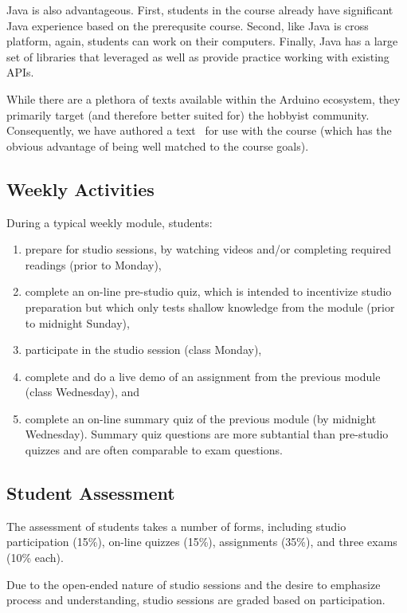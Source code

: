 Java is also advantageous.  First, students in the course already have significant Java experience based on the prerequsite course.  Second, like Java is cross platform, again, students can work on their computers.  Finally, Java has a large set of libraries that leveraged as well as provide practice working with existing APIs.

While there are a plethora of texts available within the Arduino ecosystem, they  primarily target (and therefore better suited for) the hobbyist community.  Consequently, we have authored a text~\cite{cc17} for use with the course (which has the obvious advantage of being well matched to the course goals).

\subsection{Weekly Activities}

During a typical weekly module, students:
\begin{enumerate}
  \item prepare for studio sessions, by watching videos and/or completing required readings (prior to Monday),
  \item complete an on-line pre-studio quiz, which is intended to incentivize studio preparation but which only tests shallow knowledge from the module (prior to midnight Sunday),
  \item participate in the studio session (class Monday),
  \item complete and do a live demo of an assignment from the previous module (class Wednesday),  and
  \item complete an on-line summary quiz of the previous module (by midnight Wednesday). Summary quiz questions are more subtantial than pre-studio quizzes and are often comparable to exam questions.
\end{enumerate}


\subsection{Student Assessment}

The assessment of students takes a number of forms, including studio participation (15\%), on-line quizzes (15\%), assignments (35\%), and three exams (10\% each).

Due to the open-ended nature of studio sessions and the desire to emphasize process and understanding, studio sessions are graded based on  participation.

